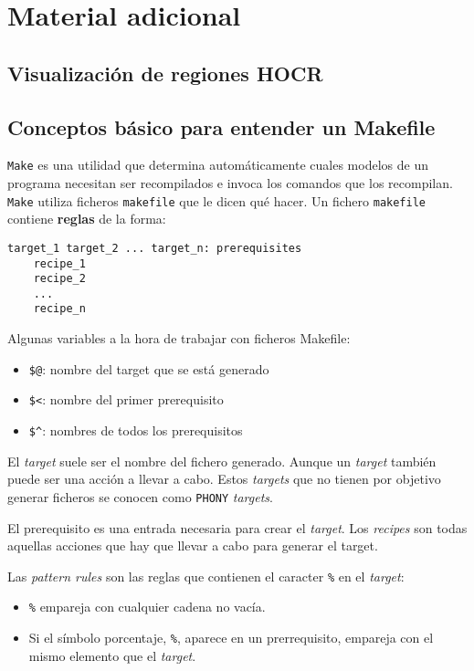 \chapter{Material adicional}
\label{chap:adicional}

\section{Visualización de regiones HOCR}

\section{Conceptos básico para entender un Makefile}

\texttt{Make} es una utilidad que determina automáticamente cuales modelos de un programa necesitan ser recompilados e invoca los comandos que los recompilan. \texttt{Make} utiliza ficheros \verb|makefile| que le dicen qué hacer. Un fichero \verb|makefile| contiene \textbf{reglas} de la forma:

\begin{verbatim}
target_1 target_2 ... target_n: prerequisites
    recipe_1
    recipe_2
    ...
    recipe_n    
\end{verbatim}

Algunas variables a la hora de trabajar con ficheros Makefile:

\begin{itemize}
    \item \verb|$@|: nombre del target que se está generado
    \item \verb|$<|: nombre del primer prerequisito
    \item \verb|$^|: nombres de todos los prerequisitos
\end{itemize}

El \emph{target} suele ser el nombre del fichero generado. Aunque un \emph{target} también puede ser una acción a llevar a cabo. Estos \emph{targets} que no tienen por objetivo generar ficheros se conocen como \verb|PHONY| \emph{targets}.

El prerequisito es una entrada necesaria para crear el \emph{target}. Los \emph{recipes} son todas aquellas acciones que hay que llevar a cabo para generar el target.

Las \emph{pattern rules} son las reglas que contienen el caracter \verb|%| en el \emph{target}:

\begin{itemize}
    \item \verb|%| empareja con cualquier cadena no vacía.
    \item Si el símbolo porcentaje, \verb|%|, aparece en un prerrequisito, empareja con el mismo elemento que el \emph{target}.
\end{itemize}

